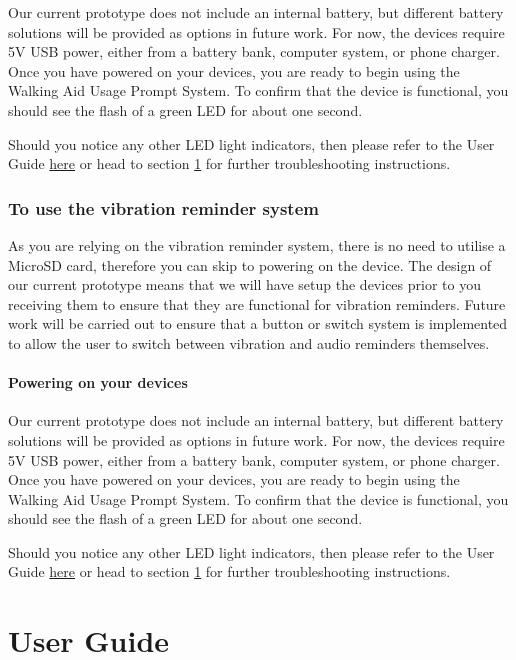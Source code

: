 				Our current prototype does not include an internal battery, but different battery solutions will be provided as options in future work. For now, the devices require 5V USB power, either from a battery bank, computer system, or phone charger. Once you have powered on your devices, you are ready to begin using the Walking Aid Usage Prompt System. To confirm that the device is functional, you should see the flash of a green LED for about one second.

				Should you notice any other LED light indicators, then please refer to the User Guide \hyperref[sec:user_guide]{here} or head to section \ref{sec:user_guide} for further troubleshooting instructions.

				\subsubsection{To use the vibration reminder system}

				As you are relying on the vibration reminder system, there is no need to utilise a MicroSD card, therefore you can skip to powering on the device. The design of our current prototype means that we will have setup the devices prior to you receiving them to ensure that they are functional for vibration reminders. Future work will be carried out to ensure that a button or switch system is implemented to allow the user to switch between vibration and audio reminders themselves.

				\paragraph{Powering on your devices}\mbox{}

				Our current prototype does not include an internal battery, but different battery solutions will be provided as options in future work. For now, the devices require 5V USB power, either from a battery bank, computer system, or phone charger. Once you have powered on your devices, you are ready to begin using the Walking Aid Usage Prompt System. To confirm that the device is functional, you should see the flash of a green LED for about one second.

				Should you notice any other LED light indicators, then please refer to the User Guide \hyperref[sec:user_guide]{here} or head to section \ref{sec:user_guide} for further troubleshooting instructions.

	\newpage
	\section{User Guide}
	\label{sec:user_guide}

